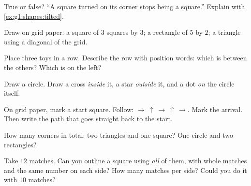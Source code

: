 \begin{exercise}[$\star$]\label{exo:g1:shapes:3}
True or false? ``A square turned on its corner stops being a
square.'' Explain with \cref{ex:g1:shapes:tilted}.
\end{exercise}

\begin{exercise}[$\star$]\label{exo:g1:shapes:4}
Draw on grid paper: a square of $3$ squares by $3$; a rectangle of
$5$ by $2$; a triangle using a diagonal of the grid.
\end{exercise}

\begin{exercise}[$\star$]\label{exo:g1:shapes:5}
Place three toys in a row. Describe the row with position words:
which is between the others? Which is on the left?
\end{exercise}

\begin{exercise}[$\star$]\label{exo:g1:shapes:6}
Draw a circle. Draw a cross \emph{inside} it, a star
\emph{outside} it, and a dot \emph{on} the circle itself.
\end{exercise}

\begin{exercise}[$\star$]\label{exo:g1:shapes:7}
On grid paper, mark a start square. Follow:
$\to\ \uparrow\ \to\ \uparrow\ \to$. Mark the arrival. Then write
the path that goes straight back to the start.
\end{exercise}

\begin{exercise}[$\star$]\label{exo:g1:shapes:8}
How many corners in total: two triangles and one square? One circle
and two rectangles?
\end{exercise}

\begin{exercise}[$\star\star$]\label{exo:g1:shapes:9}
Take $12$ matches. Can you outline a square using \emph{all} of
them, with whole matches and the same number on each side? How many
matches per side? Could you do it with $10$ matches?
\end{exercise}
